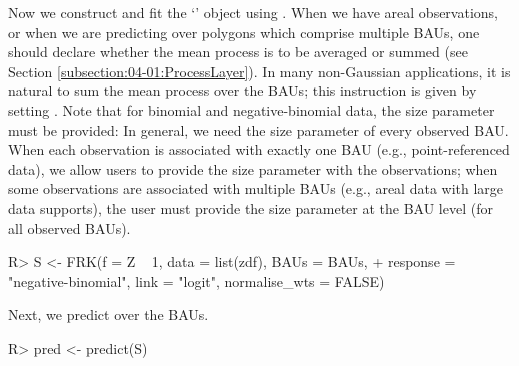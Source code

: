 \documentclass[article]{jss}
\newcommand{\class}[1]{`\code{#1}'}
\newcommand{\fct}[1]{\code{#1()}}
\begin{document}
Now we construct and fit the \class{SRE} object using \fct{FRK}. 
When we have areal observations, or when we are predicting over polygons which comprise multiple BAUs, one should declare whether the mean process is to be averaged or summed (see Section \ref{subsection:04-01:ProcessLayer}). 
In many non-Gaussian applications, it is natural to sum the mean process over the BAUs; this instruction is given by setting . 
Note that for binomial and negative-binomial data, the size parameter must be provided: In general, we need the size parameter of every observed BAU. When each observation is associated with exactly one BAU (e.g., point-referenced data), we allow users to provide the size parameter with the observations; when some observations are associated with multiple BAUs (e.g., areal data with large data supports), the user must provide the size parameter at the BAU level (for all observed BAUs).
\begin{Code}
R> S <- FRK(f = Z ~ 1, data = list(zdf), BAUs = BAUs, 
+    response = "negative-binomial", link = "logit", normalise_wts = FALSE)
\end{Code}




Next, we predict over the BAUs. %
\begin{Code}
R> pred <- predict(S)
\end{Code}
\end{document}
